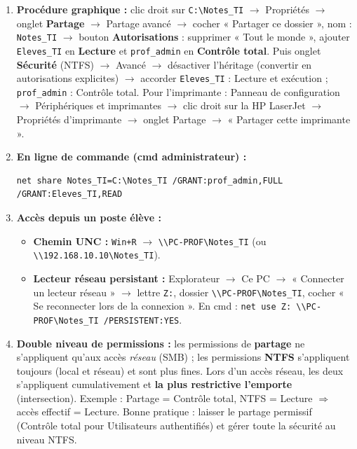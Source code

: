 \documentclass[11pt]{article}
\begin{document}
\begin{corrige}
\begin{enumerate}
    \item \textbf{Procédure graphique :} clic droit sur \texttt{C:\textbackslash Notes\_TI} $\to$ Propriétés $\to$ onglet \textbf{Partage} $\to$ Partage avancé $\to$ cocher « Partager ce dossier », nom : \texttt{Notes\_TI} $\to$ bouton \textbf{Autorisations} : supprimer « Tout le monde », ajouter \texttt{Eleves\_TI} en \textbf{Lecture} et \texttt{prof\_admin} en \textbf{Contrôle total}. Puis onglet \textbf{Sécurité} (NTFS) $\to$ Avancé $\to$ désactiver l'héritage (convertir en autorisations explicites) $\to$ accorder \texttt{Eleves\_TI} : Lecture et exécution ; \texttt{prof\_admin} : Contrôle total. Pour l'imprimante : Panneau de configuration $\to$ Périphériques et imprimantes $\to$ clic droit sur la HP LaserJet $\to$ Propriétés d'imprimante $\to$ onglet Partage $\to$ « Partager cette imprimante ».
    \item \textbf{En ligne de commande (cmd administrateur) :}
\begin{lstlisting}
net share Notes_TI=C:\Notes_TI /GRANT:prof_admin,FULL /GRANT:Eleves_TI,READ
\end{lstlisting}
    \item \textbf{Accès depuis un poste élève :}
    \begin{itemize}
        \item \textbf{Chemin UNC :} \texttt{Win+R} $\to$ \texttt{\textbackslash\textbackslash PC-PROF\textbackslash Notes\_TI} (ou \texttt{\textbackslash\textbackslash 192.168.10.10\textbackslash Notes\_TI}).
        \item \textbf{Lecteur réseau persistant :} Explorateur $\to$ Ce PC $\to$ « Connecter un lecteur réseau » $\to$ lettre \texttt{Z:}, dossier \texttt{\textbackslash\textbackslash PC-PROF\textbackslash Notes\_TI}, cocher « Se reconnecter lors de la connexion ». En cmd : \texttt{net use Z: \textbackslash\textbackslash PC-PROF\textbackslash Notes\_TI /PERSISTENT:YES}.
    \end{itemize}
    \item \textbf{Double niveau de permissions :} les permissions de \textbf{partage} ne s'appliquent qu'aux accès \emph{réseau} (SMB) ; les permissions \textbf{NTFS} s'appliquent toujours (local et réseau) et sont plus fines. Lors d'un accès réseau, les deux s'appliquent cumulativement et \textbf{la plus restrictive l'emporte} (intersection). Exemple : Partage = Contrôle total, NTFS = Lecture $\Rightarrow$ accès effectif = Lecture. Bonne pratique : laisser le partage permissif (Contrôle total pour Utilisateurs authentifiés) et gérer toute la sécurité au niveau NTFS.
\end{enumerate}
\end{corrige}
\end{document}
